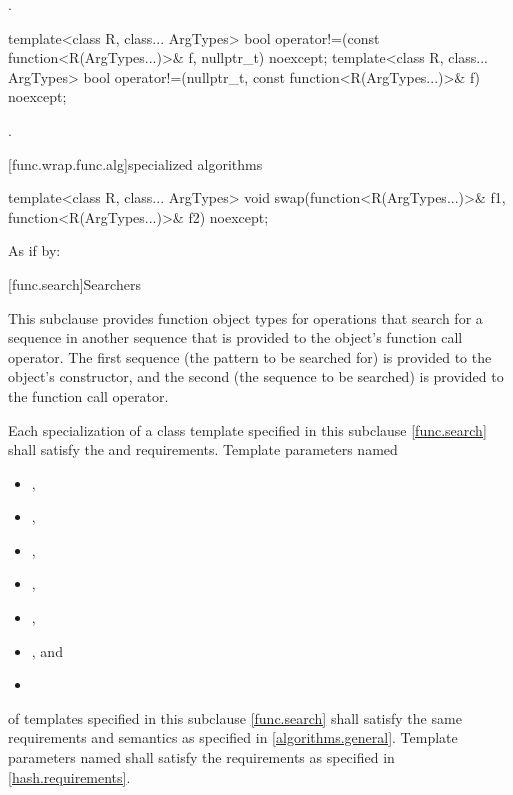 \begin{itemdescr}
\pnum\returns {}.
\end{itemdescr}

%
\begin{itemdecl}
template<class R, class... ArgTypes>
  bool operator!=(const function<R(ArgTypes...)>& f, nullptr_t) noexcept;
template<class R, class... ArgTypes>
  bool operator!=(nullptr_t, const function<R(ArgTypes...)>& f) noexcept;
\end{itemdecl}

\begin{itemdescr}
\pnum\returns {}.
\end{itemdescr}

[func.wrap.func.alg]{specialized algorithms}

%
\begin{itemdecl}
template<class R, class... ArgTypes>
  void swap(function<R(ArgTypes...)>& f1, function<R(ArgTypes...)>& f2) noexcept;
\end{itemdecl}

\begin{itemdescr}
\pnum\effects As if by: 
\end{itemdescr}%

[func.search]{Searchers}

\pnum
This subclause provides function object types for
operations that search for a sequence  in another
sequence  that is provided to the object's function call
operator.  The first sequence (the pattern to be searched for) is provided to
the object's constructor, and the second (the sequence to be searched) is
provided to the function call operator.

\pnum
Each specialization of a class template specified in this subclause \ref{func.search} shall satisfy the  and  requirements.
Template parameters named
\begin{itemize}
\item {},
\item {},
\item {},
\item {},
\item {},
\item {}, and
\item {}
\end{itemize}
of templates specified in this subclause
\ref{func.search} shall satisfy the same requirements and semantics as
specified in \ref{algorithms.general}.
Template parameters named  shall satisfy the requirements as specified in \ref{hash.requirements}.

